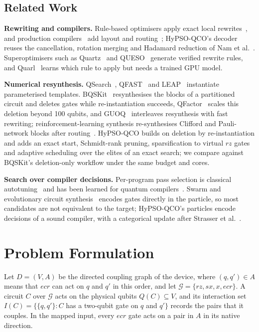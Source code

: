 \documentclass[conference,letterpaper]{IEEEtran}
\newcommand{\hypso}{HyPSO-QCO}
\begin{document}
\subsection{Related Work}
\textbf{Rewriting and compilers.} Rule-based optimisers apply exact local
rewrites~\cite{voqc,nam2018,iten2022}, and production compilers~\cite{qiskit,tket} add layout and
routing~\cite{sabre}; \hypso{}'s decoder reuses the cancellation, rotation merging and Hadamard reduction of
Nam et al.~\cite{nam2018}. Superoptimisers such as Quartz~\cite{quartz} and QUESO~\cite{queso} generate
verified rewrite rules, and Quarl~\cite{quarl} learns which rule to apply but needs a trained GPU model.

\textbf{Numerical resynthesis.} QSearch~\cite{qsearch}, QFAST~\cite{qfast} and LEAP~\cite{leap}
instantiate parameterised templates. BQSKit~\cite{bqskit} resynthesises the blocks of a partitioned circuit
and deletes gates while re-instantiation succeeds, QFactor~\cite{qfactor} scales this deletion beyond 100
qubits, and GUOQ~\cite{guoq} interleaves resynthesis with fast rewriting; reinforcement-learning synthesis
re-synthesises Clifford and Pauli-network blocks after routing~\cite{kremer2024,dubal2025}. \hypso{} builds
on deletion by re-instantiation and adds an exact start, Schmidt-rank pruning, sparsification to virtual $rz$
gates and adaptive scheduling over the elites of an exact search; we compare against BQSKit's deletion-only
workflow under the same budget and cores.

\textbf{Search over compiler decisions.} Per-program pass selection is classical
autotuning~\cite{cooper1999,opentuner} and has been learned for quantum compilers~\cite{quetschlich2023}.
Swarm and evolutionary circuit synthesis~\cite{datta2013,zelinka2023,hidayat2025} encodes gates directly in
the particle, so most candidates are not equivalent to the target; \hypso{}'s particles encode decisions of a
sound compiler, with a categorical update after Strasser et al.~\cite{strasser2016}.

\section{Problem Formulation}
Let $D = (V, A)$ be the directed coupling graph of the device, where $(q, q')\in A$ means that $ecr$ can act
on $q$ and $q'$ in this order, and let $\mathcal{G} = \{rz, sx, x, ecr\}$. A circuit $C$ over $\mathcal{G}$
acts on the physical qubits $Q(C)\subseteq V$, and its interaction set $I(C) = \{\{q, q'\} : C$ has a
two-qubit gate on $q$ and $q'\}$ records the pairs that it couples. In the mapped input, every $ecr$ gate
acts on a pair in $A$ in its native direction.
\end{document}
